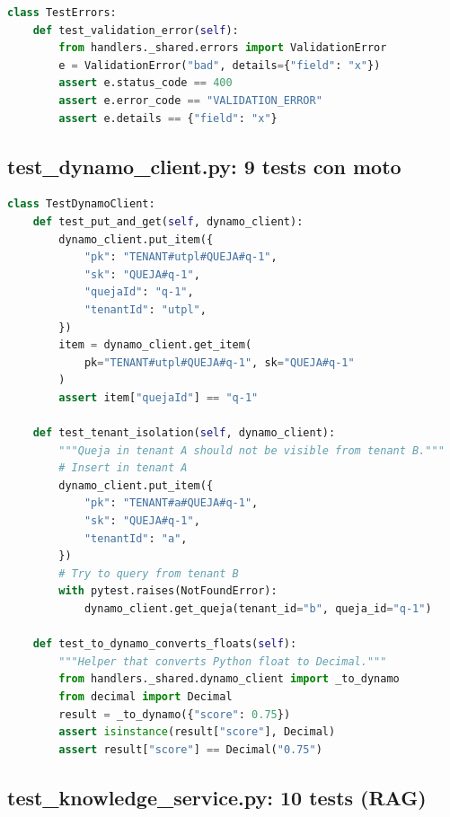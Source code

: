 \documentclass[11pt,a4paper,oneside]{article}
\begin{document}
\begin{lstlisting}[language=Python,caption={TestErrors}]
class TestErrors:
    def test_validation_error(self):
        from handlers._shared.errors import ValidationError
        e = ValidationError("bad", details={"field": "x"})
        assert e.status_code == 400
        assert e.error_code == "VALIDATION_ERROR"
        assert e.details == {"field": "x"}
\end{lstlisting}

\subsection{test\_dynamo\_client.py: 9 tests con moto}

\begin{lstlisting}[language=Python,caption={TestDynamoClient}]
class TestDynamoClient:
    def test_put_and_get(self, dynamo_client):
        dynamo_client.put_item({
            "pk": "TENANT#utpl#QUEJA#q-1",
            "sk": "QUEJA#q-1",
            "quejaId": "q-1",
            "tenantId": "utpl",
        })
        item = dynamo_client.get_item(
            pk="TENANT#utpl#QUEJA#q-1", sk="QUEJA#q-1"
        )
        assert item["quejaId"] == "q-1"

    def test_tenant_isolation(self, dynamo_client):
        """Queja in tenant A should not be visible from tenant B."""
        # Insert in tenant A
        dynamo_client.put_item({
            "pk": "TENANT#a#QUEJA#q-1",
            "sk": "QUEJA#q-1",
            "tenantId": "a",
        })
        # Try to query from tenant B
        with pytest.raises(NotFoundError):
            dynamo_client.get_queja(tenant_id="b", queja_id="q-1")

    def test_to_dynamo_converts_floats(self):
        """Helper that converts Python float to Decimal."""
        from handlers._shared.dynamo_client import _to_dynamo
        from decimal import Decimal
        result = _to_dynamo({"score": 0.75})
        assert isinstance(result["score"], Decimal)
        assert result["score"] == Decimal("0.75")
\end{lstlisting}

\subsection{test\_knowledge\_service.py: 10 tests (RAG)}
\end{document}
